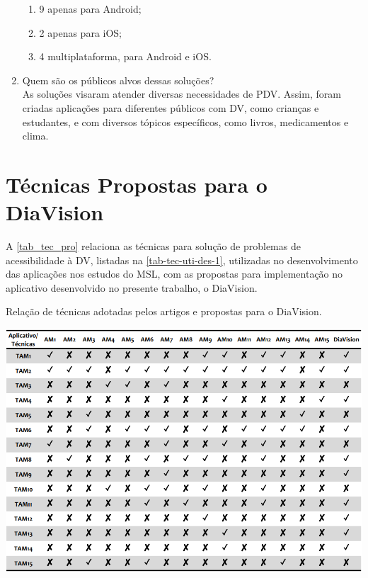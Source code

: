 \begin{enumerate}
            \begin{enumerate}
                  \item 9 apenas para Android;
                  \item 2 apenas para iOS\@;
                  \item 4 multiplataforma, para Android e iOS\@.
            \end{enumerate}
      \item Quem são os públicos alvos dessas soluções? \\
            As soluções visaram atender diversas necessidades de PDV\@.
            Assim, foram criadas aplicações para diferentes públicos com DV,
            como crianças e estudantes, e com diversos tópicos específicos,
            como livros, medicamentos e clima.
\end{enumerate}

\section{Técnicas Propostas para o DiaVision}

A \autoref{tab_tec_pro} relaciona as técnicas para solução de problemas de acessibilidade à DV, listadas na \autoref{tab-tec-uti-des-1},
utilizadas no desenvolvimento das aplicações nos estudos do MSL, com as propostas para implementação no aplicativo
desenvolvido no presente trabalho, o DiaVision.
\begin{table}
      \caption{Relação de técnicas adotadas pelos artigos e propostas para o DiaVision.}
      \label{tab_tec_pro}
      \begin{center}
            \includegraphics[scale=0.68]{Imagens/proposta/tecnicas_propostas.png}
      \end{center}
\end{table}

